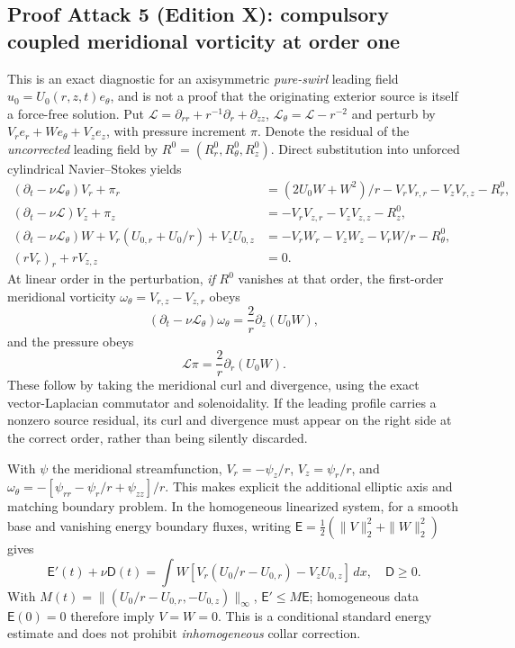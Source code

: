 \subsection*{Proof Attack 5 (Edition X): compulsory coupled meridional vorticity at order one}
\label{subsec:n1-coupled-vorticity-edition-X}
This is an exact diagnostic for an axisymmetric \emph{pure-swirl}
leading field $u_0=U_0(r,z,t)e_\theta$, and is not a proof that
the originating exterior source is itself a force-free solution.
Put $\mathcal L=\partial_{rr}+r^{-1}\partial_r+\partial_{zz}$,
$\mathcal L_\theta=\mathcal L-r^{-2}$ and perturb by
$V_r e_r+W e_\theta+V_z e_z$, with pressure increment $\pi$.
Denote the residual of the \emph{uncorrected} leading field
by $R^0=(R^0_r,R^0_\theta,R^0_z)$.
Direct substitution into unforced cylindrical Navier--Stokes yields
\begin{align*}
(\partial_t-\nu\mathcal L_\theta)V_r+\pi_r
&=(2U_0W+W^2)/r-V_rV_{r,r}-V_zV_{r,z}-R^0_r,\\
(\partial_t-\nu\mathcal L)V_z+\pi_z
&=-V_rV_{z,r}-V_zV_{z,z}-R^0_z,\\
(\partial_t-\nu\mathcal L_\theta)W
+V_r(U_{0,r}+U_0/r)+V_zU_{0,z}
&=-V_rW_r-V_zW_z-V_rW/r-R^0_\theta,\\
(rV_r)_r+rV_{z,z}&=0.
\end{align*}
At linear order in the perturbation, \emph{if} $R^0$ vanishes
at that order, the first-order meridional vorticity
$\omega_\theta=V_{r,z}-V_{z,r}$ obeys
\begin{equation}\label{eq:n1-coupled-vorticity-X}
\boxed{(\partial_t-\nu\mathcal L_\theta)\omega_\theta
       =\frac2r\partial_z(U_0W),}
\end{equation}
and the pressure obeys
\begin{equation}\label{eq:n1-pressure-poisson-X}
\boxed{\mathcal L\pi=\frac2r\partial_r(U_0W).}
\end{equation}
These follow by taking the meridional curl and divergence,
using the exact vector-Laplacian commutator and solenoidality.
If the leading profile carries a nonzero source residual, its curl
and divergence must appear on the right side at the correct order,
rather than being silently discarded.

With $\psi$ the meridional streamfunction,
$V_r=-\psi_z/r$, $V_z=\psi_r/r$, and
$\omega_\theta=-[\psi_{rr}-\psi_r/r+\psi_{zz}]/r$.
This makes explicit the additional elliptic axis and matching
boundary problem. In the homogeneous linearized system, for a smooth
base and vanishing energy boundary fluxes, writing
$\mathsf E=\tfrac12(\|V\|_2^2+\|W\|_2^2)$ gives
\[
\mathsf E'(t)+\nu\mathsf D(t)
=\int W[V_r(U_0/r-U_{0,r})-V_zU_{0,z}]\,dx,
\quad\mathsf D\ge0.
\]
With $M(t)=\|(U_0/r-U_{0,r},-U_{0,z})\|_\infty$,
$\mathsf E'\le M\mathsf E$; homogeneous data $\mathsf E(0)=0$
therefore imply $V=W=0$. This is a conditional standard energy
estimate and does not prohibit \emph{inhomogeneous} collar correction.

